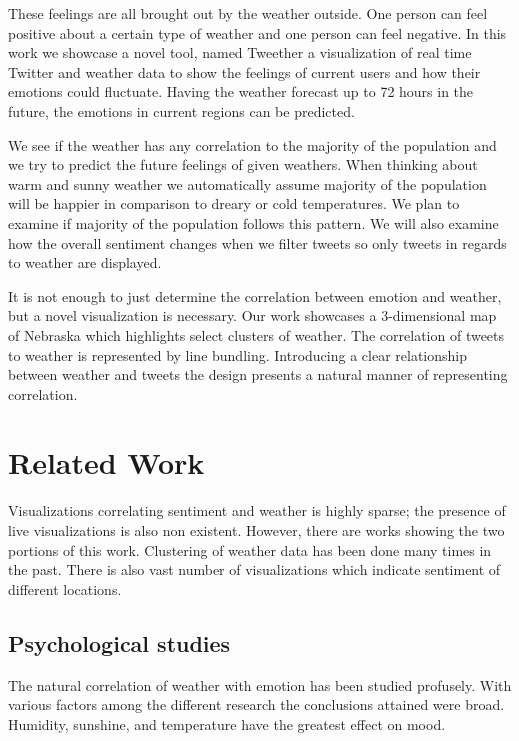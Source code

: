 \documentclass[journal]{vgtc}                %
\begin{document}
These feelings are all brought out by the weather outside. One person can feel positive about a certain type of weather and one person can feel negative. In this work we showcase a novel tool, named Tweether a visualization of real time Twitter and weather data to show the feelings of current users and how their emotions could fluctuate. Having the weather forecast up to 72 hours in the future, the emotions in current regions can be predicted. 

We see if the weather has any correlation to the majority of the population and we try to predict the future feelings of given weathers.  When thinking about warm and sunny weather we automatically assume majority of the population will be happier in comparison to dreary or cold temperatures. We plan to examine if majority of the population follows this pattern. We will also examine how the overall sentiment changes when we filter tweets so only tweets in regards to weather are displayed.

It is not enough to just determine the correlation between emotion and weather, but a novel visualization is necessary. Our work showcases a 3-dimensional map of Nebraska which highlights select clusters of weather. The correlation of tweets to weather is represented by line bundling. Introducing a clear relationship between weather and tweets the design presents a natural manner of representing correlation.


\section{Related Work}

Visualizations correlating sentiment and weather is highly sparse; the presence of live visualizations is also non existent. However, there are works showing the two portions of this work. Clustering of weather data has been done many times in the past. There is also vast number of visualizations which indicate sentiment of different locations.

\subsection{Psychological studies}

The natural correlation of weather with emotion has been studied profusely. \cite{bollen2011twitter,denissen2008effects,hannak2012tweetin,howarth1984multidimensional,lambert2002effect}  With various factors among the different research the conclusions attained were broad. Humidity, sunshine, and temperature have the greatest effect on mood. \cite{bollen2011twitter} 
\end{document}
